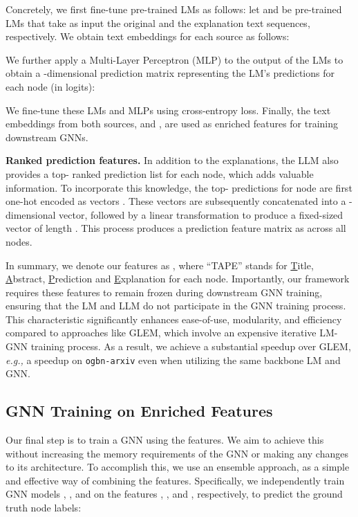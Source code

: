 \documentclass{article}
\newcommand{\eg}{\emph{e.g.,}\xspace}
\begin{document}
Concretely, we first fine-tune pre-trained LMs as follows: let  and  be pre-trained LMs that take as input the original  and the explanation  text sequences, respectively. We obtain text embeddings for each source as follows:

We further apply a Multi-Layer Perceptron (MLP) to the output of the LMs to obtain a -dimensional prediction matrix representing the LM's predictions for each node (in logits):

We fine-tune these LMs and MLPs using cross-entropy loss. Finally, the text embeddings from both sources,  and , are used as enriched features for training downstream GNNs.

\textbf{Ranked prediction features.}
In addition to the explanations, the LLM also provides a top- ranked prediction list for each node, which adds valuable information. To incorporate this knowledge, the top- predictions for node  are first one-hot encoded as vectors . These vectors are subsequently concatenated into a -dimensional vector, followed by a linear transformation to produce a fixed-sized vector of length . This process produces a prediction feature matrix as  across all nodes.


In summary, we denote our features as , where ``TAPE'' stands for \underline{T}itle, \underline{A}bstract, \underline{P}rediction and \underline{E}xplanation for each node. Importantly, our framework requires these features to remain frozen during downstream GNN training, ensuring that the LM and LLM do not participate in the GNN training process. This characteristic significantly enhances ease-of-use, modularity, and efficiency compared to approaches like GLEM, which involve an expensive iterative LM-GNN training process. As a result, we achieve a substantial speedup over GLEM, \eg a  speedup on \texttt{ogbn-arxiv} even when utilizing the same backbone LM and GNN.

\subsection{GNN Training on Enriched Features}

Our final step is to train a GNN using the  features. We aim to achieve this without increasing the memory requirements of the GNN or making any changes to its architecture. To accomplish this, we use an ensemble approach, as a simple and effective way of combining the features. Specifically, we independently train GNN models , , and  on the features , , and , respectively, to predict the ground truth node labels:
\end{document}
